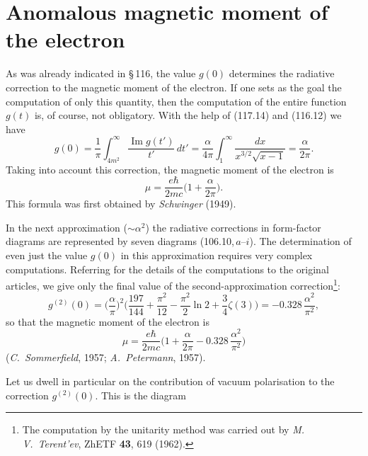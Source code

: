 
\section{Anomalous magnetic moment of the electron}


As was already indicated in \S\,116, the value $g(0)$ determines the radiative correction to the magnetic moment of the electron. If one sets as the goal the computation of only this quantity, then the computation of the entire function $g(t)$ is, of course, not obligatory. With the help of (117.14) and (116.12) we have
\begin{equation}
g(0) = \frac{1}{\pi}\int_{4m^2}^{\infty}\frac{\operatorname{Im} g(t')}{t'}\,dt' = \frac{\alpha}{4\pi}\int_1^{\infty}\frac{dx}{x^{3/2}\sqrt{x-1}} = \frac{\alpha}{2\pi}.
\label{eq:118.1}
\end{equation}
Taking into account this correction, the magnetic moment of the electron is
\begin{equation}
\mu = \frac{e\hbar}{2mc}\biggl(1 + \frac{\alpha}{2\pi}\biggr).
\label{eq:118.2}
\end{equation}
This formula was first obtained by \emph{Schwinger} (1949).

In the next approximation ($\sim\alpha^2$) the radiative corrections in form-factor diagrams are represented by seven diagrams (106.10,\,$a$--$i$). The determination of even just the value $g(0)$ in this approximation requires very complex computations. Referring for the details of the computations to the original articles, we give only the final value of the second-approximation correction\footnote{The computation by the unitarity method was carried out by \emph{M.\,V.~Terent'ev}, ZhETF \textbf{43}, 619 (1962).}:
\begin{equation}
g^{(2)}(0) = \biggl(\frac{\alpha}{\pi}\biggr)^{\!2}\biggl(\frac{197}{144} + \frac{\pi^2}{12} - \frac{\pi^2}{2}\ln 2 + \frac{3}{4}\zeta(3)\biggr) = -0.328\,\frac{\alpha^2}{\pi^2},
\label{eq:118.3}
\end{equation}
so that the magnetic moment of the electron is
\begin{equation}
\mu = \frac{e\hbar}{2mc}\biggl(1 + \frac{\alpha}{2\pi} - 0.328\,\frac{\alpha^2}{\pi^2}\biggr)
\label{eq:118.4}
\end{equation}
(\emph{C.~Sommerfield}, 1957; \emph{A.~Petermann}, 1957).

Let us dwell in particular on the contribution of vacuum polarisation to the correction $g^{(2)}(0)$. This is the diagram

